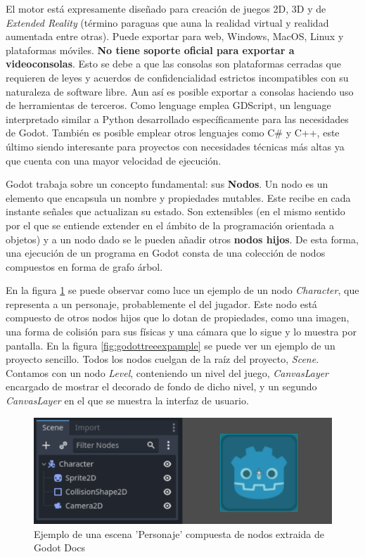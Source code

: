 El motor está expresamente diseñado para creación de juegos 2D, 3D y de \textit{Extended Reality} (término paraguas que auna la realidad virtual y realidad aumentada entre otras). Puede exportar para web, Windows, MacOS, Linux y plataformas móviles. \textbf{No tiene soporte oficial para exportar a videoconsolas}\cite{godot-console-export}. Esto se debe a que las consolas son plataformas cerradas que requieren de leyes y acuerdos de confidencialidad estrictos incompatibles con su naturaleza de software libre. Aun así es posible exportar a consolas haciendo uso de herramientas de terceros. Como lenguage emplea GDScript\cite{gdscript}, un lenguage interpretado similar a Python desarrollado específicamente para las necesidades de Godot. También es posible emplear otros lenguajes como C\# y C++, este último siendo interesante para proyectos con necesidades técnicas más altas ya que cuenta con una mayor velocidad de ejecución.

Godot trabaja sobre un concepto fundamental: sus \textbf{Nodos}. Un nodo es un elemento que encapsula un nombre y propiedades mutables. Este recibe en cada instante señales que actualizan su estado. Son extensibles (en el mismo sentido por el que se entiende extender en el ámbito de la programación orientada a objetos) y a un nodo dado se le pueden añadir otros \textbf{nodos hijos}. De esta forma, una ejecución de un programa en Godot consta de una colección de nodos compuestos en forma de grafo árbol.

En la figura \ref{fig:godotsceneexpample} se puede observar como luce un ejemplo de un nodo \textit{Character}, que representa a un personaje, probablemente el del jugador. Este nodo está compuesto de otros nodos hijos que lo dotan de propiedades, como una imagen, una forma de colisión para sus físicas y una cámara que lo sigue y lo muestra por pantalla. En la figura \ref{fig:godottreeexpample} se puede ver un ejemplo de un proyecto sencillo. Todos los nodos cuelgan de la raíz del proyecto, \textit{Scene}. Contamos con un nodo \textit{Level}, conteniendo un nivel del juego, \textit{CanvasLayer} encargado de mostrar el decorado de fondo de dicho nivel, y un segundo \textit{CanvasLayer} en el que se muestra la interfaz de usuario.

\begin{figure}[h]
    \centering
    \includegraphics[scale=0.3]{img/godot-node.png}
    \caption[Ejemplo de escena de Godot]{Ejemplo de una escena 'Personaje' compuesta de nodos extraida de Godot Docs\cite{godot-docs}}
    \label{fig:godotsceneexpample}
\end{figure}

